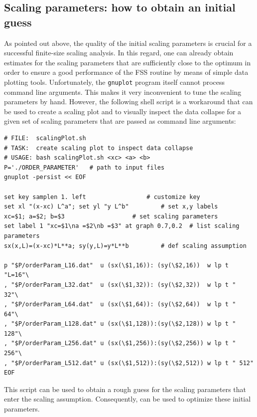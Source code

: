 \subsection{Scaling parameters: how to obtain an initial guess}
\label{ASAsect04subsect02}
As pointed out above, the quality of the initial scaling parameters is crucial for 
a successful finite-size scaling analysis.
In this regard, one can already obtain estimates for the scaling parameters that are
sufficiently close to the optimum in order to ensure a good performance of the
FSS routine by means of simple data plotting tools. 
Unfortunately, the {\tt gnuplot} program itself cannot process command line arguments.
This makes it very inconvenient to tune the scaling parameters by hand.
However, the following shell script is a workaround that can be used to create a 
scaling plot and to visually inspect the data collapse for a given set of scaling parameters
that are passed as command line arguments:

\begin{lstlisting}
# FILE:  scalingPlot.sh
# TASK:  create scaling plot to inspect data collapse
# USAGE: bash scalingPlot.sh <xc> <a> <b>
P='./ORDER_PARAMETER' 	# path to input files
gnuplot -persist << EOF

set key samplen 1. left					# customize key
set xl "(x-xc) L^a"; set yl "y L^b"			# set x,y labels 
xc=$1; a=$2; b=$3					# set scaling parameters
set label 1 "xc=$1\na =$2\nb =$3" at graph 0.7,0.2 	# list scaling parameters
sx(x,L)=(x-xc)*L**a; sy(y,L)=y*L**b			# def scaling assumption

p "$P/orderParam_L16.dat"  u (sx(\$1,16)): (sy(\$2,16))  w lp t "L=16"\
, "$P/orderParam_L32.dat"  u (sx(\$1,32)): (sy(\$2,32))  w lp t "  32"\
, "$P/orderParam_L64.dat"  u (sx(\$1,64)): (sy(\$2,64))  w lp t "  64"\
, "$P/orderParam_L128.dat" u (sx(\$1,128)):(sy(\$2,128)) w lp t " 128"\
, "$P/orderParam_L256.dat" u (sx(\$1,256)):(sy(\$2,256)) w lp t " 256"\
, "$P/orderParam_L512.dat" u (sx(\$1,512)):(sy(\$2,512)) w lp t " 512"
EOF
\end{lstlisting}
This script can be used to obtain a rough guess for the scaling parameters that enter
the scaling assumption. Consequently, \myProg{} can be used to optimize these initial
parameters.
 

